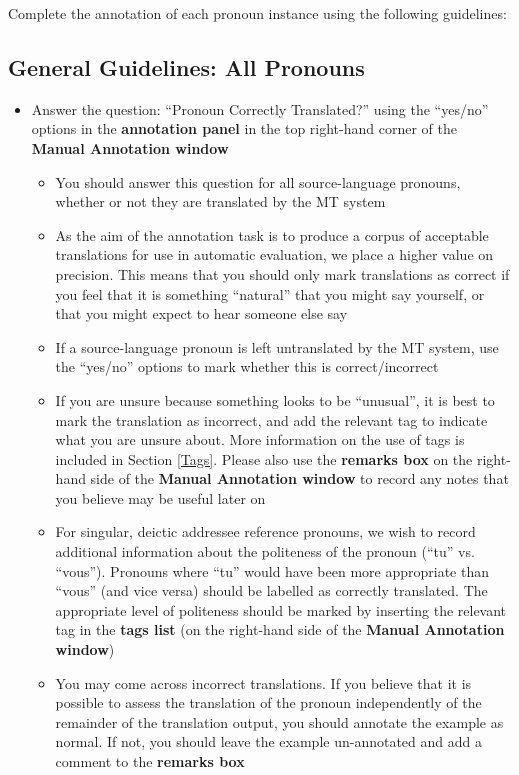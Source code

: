 \documentclass[11pt]{article} %
\begin{document}
Complete the annotation of each pronoun instance using the following guidelines:


\subsection{General Guidelines: All Pronouns}

\begin{itemize}
  \item Answer the question: ``Pronoun Correctly Translated?'' using the ``yes/no'' options in the \textbf{annotation panel} in the top right-hand corner of the \textbf{Manual Annotation window}
  \begin{itemize}
    \item You should answer this question for all source-language pronouns, whether or not they are translated by the MT system
    \item As the aim of the annotation task is to produce a corpus of acceptable translations for use in automatic evaluation, we place a higher value on precision. This means that you should only mark translations as correct if you feel that it is something ``natural'' that you might say yourself, or that you might expect to hear someone else say
    \item If a source-language pronoun is left untranslated by the MT system, use the ``yes/no'' options to mark whether this is correct/incorrect
    \item If you are unsure because something looks to be ``unusual'', it is best to mark the translation as incorrect, and add the relevant tag to indicate what you are unsure about. More information on the use of tags is included in Section \ref{Tags}. Please also use the \textbf{remarks box} on the right-hand side of the \textbf{Manual Annotation window} to record any notes that you believe may be useful later on
    \item For singular, deictic addressee reference pronouns, we wish to record additional information about the politeness of the pronoun (``tu'' vs. ``vous''). Pronouns where ``tu'' would have been more appropriate than ``vous'' (and vice versa) should be labelled as correctly translated. The appropriate level of politeness should be marked by inserting the relevant tag in the \textbf{tags list} (on the right-hand side of the \textbf{Manual Annotation window})
    \item You may come across incorrect translations. If you believe that it is possible to assess the translation of the pronoun independently of the remainder of the translation output, you should annotate the example as normal. If not, you should leave the example un-annotated and add a comment to the \textbf{remarks box}

\end{itemize}
\end{itemize}
\end{document}
